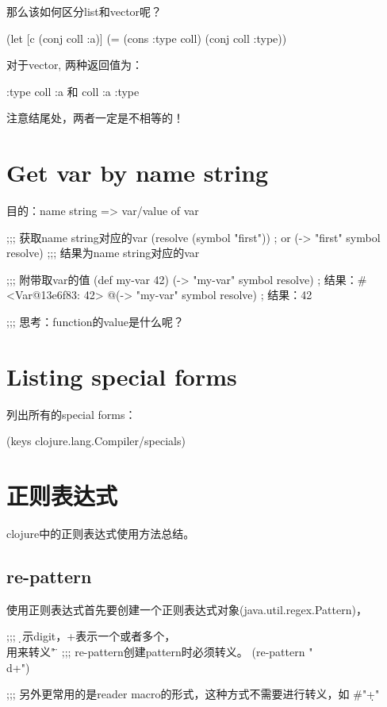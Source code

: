 \documentclass[a4paper,11pt]{article}
\begin{document}
  那么该如何区分list和vector呢？
  
  \begin{schemecode}
(let [c (conj coll :a)]
  (= (cons :type coll) (conj coll :type))
  \end{schemecode}

  对于vector, 两种返回值为：\par
  :type coll :a 和 coll :a :type

  注意结尾处，两者一定是不相等的！


  \section[Get var by name string]{Get var by name string}
  目的：name string => var/value of var

  \begin{schemecode}
;;; 获取name string对应的var
(resolve (symbol "first"))
; or
(-> "first" symbol resolve)
;;; 结果为name string对应的var

;;; 附带取var的值
(def my-var 42)
(-> "my-var" symbol resolve)
; 结果：#<Var@13e6f83: 42>
@(-> "my-var" symbol resolve)
; 结果：42

;;; 思考：function的value是什么呢？
  \end{schemecode}


  \section[Listing special forms]{Listing special forms}
  列出所有的special forms：

  \begin{schemecode}
(keys clojure.lang.Compiler/specials)
  \end{schemecode}


  \section[正则表达式]{正则表达式}
  clojure中的正则表达式使用方法总结。

  \subsection[re-pattern]{re-pattern}
  使用正则表达式首先要创建一个正则表达式对象(java.util.regex.Pattern)，

  \begin{schemecode}
;;; \d 表示digit，+表示一个或者多个，\\用来转义"\"，
;;; re-pattern创建pattern时必须转义。
(re-pattern "\\d+")

;;; 另外更常用的是reader macro的形式，这种方式不需要进行转义，如
#"\d+"
  \end{schemecode}
\end{document}

